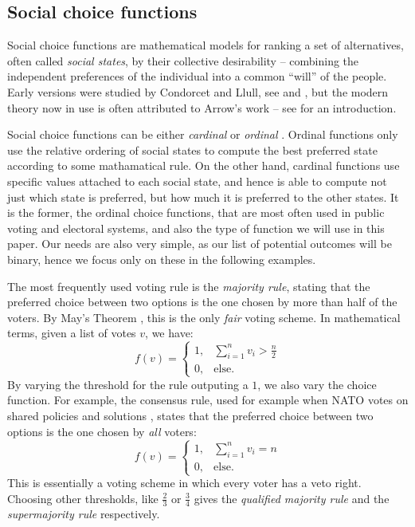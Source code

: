 \subsection{Social choice functions}
\label{sec:social-choice-functions}

Social choice functions are mathematical models for ranking a set of alternatives, often called \emph{social states}, by their collective desirability -- combining the independent preferences of the individual into a common ``will'' of the people. Early versions were studied by Condorcet and Llull, see \parencite{Condorcet_1785} and \parencite{Colomer_2013}, but the modern theory now in use is often attributed to Arrow's work \parencite{Arrow_1951} -- see \parencite{Moulin_1988} for an introduction. 

Social choice functions can be either \emph{cardinal} or \emph{ordinal} \parencite{Sen_1977}. Ordinal functions only use the relative ordering of social states to compute the best preferred state according to some mathamatical rule. On the other hand, cardinal functions use specific values attached to each social state, and hence is able to compute not just which state is preferred, but how much it is preferred to the other states. It is the former, the ordinal choice functions, that are most often used in public voting and electoral systems, and also the type of function we will use in this paper. Our needs are also very simple, as our list of potential outcomes will be binary, hence we focus only on these in the following examples. 

The most frequently used voting rule is the \emph{majority rule}, stating that the preferred choice between two options is the one chosen by more than half of the voters. By May's Theorem \parencite{May_1952}, this is the only \emph{fair} voting scheme. In mathematical terms, given a list of votes $v$, we have:
\[f(v) = 
\begin{cases}
    1, &\displaystyle \sum_{i=1}^{n} v_i > \frac{n}{2}  \\
    0, & \text{else}.
\end{cases}
\]
By varying the threshold for the rule outputing a $1$, we also vary the choice function. For example, the consensus rule, used for example when NATO votes on shared policies and solutions \parencite{NATOConsensus}, states that the preferred choice between two options is the one chosen by \emph{all} voters:
\[f(v) = 
\begin{cases}
    1, &\displaystyle \sum_{i=1}^{n} v_i = n  \\
    0, & \text{else}.
\end{cases}
\]
This is essentially a voting scheme in which every voter has a veto right. Choosing other thresholds, like $\frac{2}{3}$ or $\frac{3}{4}$ gives the \emph{qualified majority rule} and the \emph{supermajority rule} respectively. 

